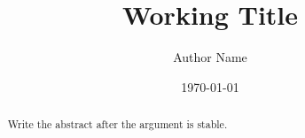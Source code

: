 \documentclass[11pt]{article}
\title{Working Title}
\author{Author Name}
\date{\today}
\begin{document}
\maketitle

\begin{abstract}
Write the abstract after the argument is stable.
\end{abstract}






\end{document}
